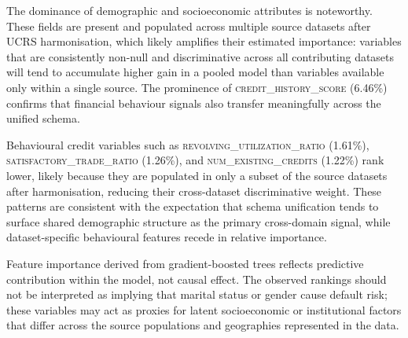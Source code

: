\documentclass[onecolumn]{IEEEtai}
\begin{document}
The dominance of demographic and socioeconomic attributes is noteworthy. These fields are present and populated across multiple source datasets after UCRS harmonisation, which likely amplifies their estimated importance: variables that are consistently non-null and discriminative across all contributing datasets will tend to accumulate higher gain in a pooled model than variables available only within a single source. The prominence of \textsc{credit\_history\_score} (6.46\%) confirms that financial behaviour signals also transfer meaningfully across the unified schema.

Behavioural credit variables such as \textsc{revolving\_utilization\_ratio} (1.61\%), \textsc{satisfactory\_trade\_ratio} (1.26\%), and \textsc{num\_existing\_credits} (1.22\%) rank lower, likely because they are populated in only a subset of the source datasets after harmonisation, reducing their cross-dataset discriminative weight. These patterns are consistent with the expectation that schema unification tends to surface shared demographic structure as the primary cross-domain signal, while dataset-specific behavioural features recede in relative importance.

Feature importance derived from gradient-boosted trees reflects predictive contribution within the model, not causal effect. The observed rankings should not be interpreted as implying that marital status or gender cause default risk; these variables may act as proxies for latent socioeconomic or institutional factors that differ across the source populations and geographies represented in the data.
\end{document}
